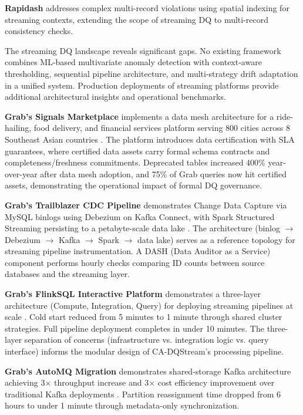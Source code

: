 \textbf{Rapidash} addresses complex multi-record violations using spatial indexing for streaming contexts, extending the scope of streaming DQ to multi-record consistency checks.

The streaming DQ landscape reveals significant gaps. No existing framework combines ML-based multivariate anomaly detection with context-aware thresholding, sequential pipeline architecture, and multi-strategy drift adaptation in a unified system. Production deployments of streaming platforms provide additional architectural insights and operational benchmarks.

\textbf{Grab's Signals Marketplace} implements a data mesh architecture for a ride-hailing, food delivery, and financial services platform serving 800 cities across 8 Southeast Asian countries \citep{grab_streaming_dq}. The platform introduces data certification with SLA guarantees, where certified data assets carry formal schema contracts and completeness/freshness commitments. Deprecated tables increased 400\% year-over-year after data mesh adoption, and 75\% of Grab queries now hit certified assets, demonstrating the operational impact of formal DQ governance.

\textbf{Grab's Trailblazer CDC Pipeline} demonstrates Change Data Capture via MySQL binlogs using Debezium on Kafka Connect, with Spark Structured Streaming persisting to a petabyte-scale data lake \citep{grab_streaming_dq}. The architecture (binlog $\rightarrow$ Debezium $\rightarrow$ Kafka $\rightarrow$ Spark $\rightarrow$ data lake) serves as a reference topology for streaming pipeline instrumentation. A DASH (Data Auditor as a Service) component performs hourly checks comparing ID counts between source databases and the streaming layer.

\textbf{Grab's FlinkSQL Interactive Platform} demonstrates a three-layer architecture (Compute, Integration, Query) for deploying streaming pipelines at scale \citep{grab_streaming_dq}. Cold start reduced from 5 minutes to 1 minute through shared cluster strategies. Full pipeline deployment completes in under 10 minutes. The three-layer separation of concerns (infrastructure vs. integration logic vs. query interface) informs the modular design of CA-DQStream's processing pipeline.

\textbf{Grab's AutoMQ Migration} demonstrates shared-storage Kafka architecture achieving 3$\times$ throughput increase and 3$\times$ cost efficiency improvement over traditional Kafka deployments \citep{grab_streaming_dq}. Partition reassignment time dropped from 6 hours to under 1 minute through metadata-only synchronization.

